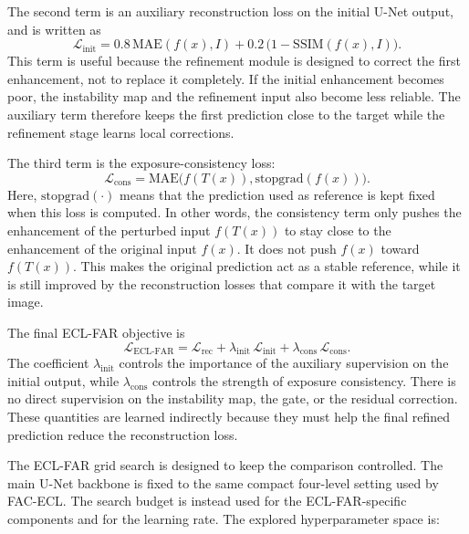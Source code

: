 The second term is an auxiliary reconstruction loss on the initial U-Net output, and is written as
\begin{equation}
	\mathcal{L}_{\mathrm{init}}
	=
	0.8\,\mathrm{MAE}(f(x), I)
	+
	0.2\,\bigl(1-\mathrm{SSIM}(f(x), I)\bigr).
	\label{eq:ecl_far_init_loss}
\end{equation}
This term is useful because the refinement module is designed to correct the first enhancement, not to replace it completely. If the initial enhancement becomes poor, the instability map and the refinement input also become less reliable. The auxiliary term therefore keeps the first prediction close to the target while the refinement stage learns local corrections.

The third term is the exposure-consistency loss:
\begin{equation}
	\mathcal{L}_{\mathrm{cons}}
	=
	\mathrm{MAE}
	\bigl(
	f(T(x)),
	\mathrm{stopgrad}(f(x))
	\bigr).
	\label{eq:ecl_far_cons_loss}
\end{equation}
Here, $\mathrm{stopgrad}(\cdot)$ means that the prediction used as reference is kept fixed when this loss is computed. In other words, the consistency term only pushes the enhancement of the perturbed input $f(T(x))$ to stay close to the enhancement of the original input $f(x)$. It does not push $f(x)$ toward $f(T(x))$. This makes the original prediction act as a stable reference, while it is still improved by the reconstruction losses that compare it with the target image.

The final ECL-FAR objective is
\begin{equation}
	\mathcal{L}_{\mathrm{ECL\text{-}FAR}}
	=
	\mathcal{L}_{\mathrm{rec}}
	+
	\lambda_{\mathrm{init}}\,\mathcal{L}_{\mathrm{init}}
	+
	\lambda_{\mathrm{cons}}\,\mathcal{L}_{\mathrm{cons}}.
	\label{eq:ecl_far_loss}
\end{equation}
The coefficient $\lambda_{\mathrm{init}}$ controls the importance of the auxiliary supervision on the initial output, while $\lambda_{\mathrm{cons}}$ controls the strength of exposure consistency. There is no direct supervision on the instability map, the gate, or the residual correction. These quantities are learned indirectly because they must help the final refined prediction reduce the reconstruction loss.

The ECL-FAR grid search is designed to keep the comparison controlled. The main U-Net backbone is fixed to the same compact four-level setting used by FAC-ECL. The search budget is instead used for the ECL-FAR-specific components and for the learning rate. The explored hyperparameter space is:

